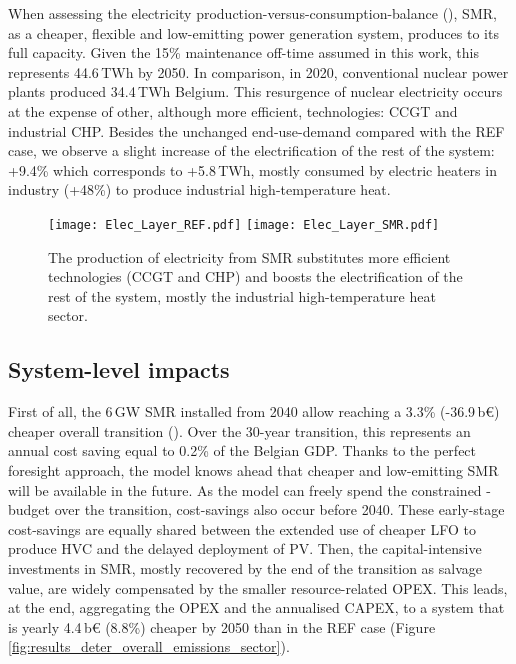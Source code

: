 \newpage
When assessing the electricity production-versus-consumption-balance (), \gls{SMR}, as a cheaper, flexible and low-emitting power generation system, produces to its full capacity. Given the 15\% maintenance off-time assumed in this work, this represents 44.6\,TWh by 2050. In comparison, in 2020, conventional nuclear power plants produced 34.4\,TWh Belgium. This resurgence of nuclear electricity occurs at the expense of other, although more efficient, technologies: \gls{CCGT} and industrial \gls{CHP}. Besides the unchanged end-use-demand compared with the REF case, we observe a slight increase of the electrification of the rest of the system: +9.4\% which corresponds to +5.8\,TWh, mostly consumed by electric heaters in industry (+48\%) to produce industrial high-temperature heat.

\begin{figure}[htbp!]
\centering
\texttt{[image: Elec\_Layer\_REF.pdf]}
\texttt{[image: Elec\_Layer\_SMR.pdf]}
\caption{The production of electricity from \gls{SMR} substitutes more efficient technologies (\ie \gls{CCGT} and \gls{CHP}) and boosts the electrification of the rest of the system, mostly the industrial high-temperature heat sector.}
\label{fig:results_deter_layer_elec}
\end{figure}

\newpage
\subsection{System-level impacts}
\label{subsec:atom_mol:results_deter_overall}
First of all, the 6\,GW \gls{SMR} installed from 2040 allow reaching a 3.3\% (-36.9\,b€) cheaper overall transition (). Over the 30-year transition, this represents an annual cost saving equal to 0.2\% of the Belgian GDP. Thanks to the perfect foresight approach, the model knows ahead that cheaper and low-emitting \gls{SMR} will be available in the future. As the model can freely spend the constrained -budget over the transition, cost-savings also occur before 2040. These early-stage cost-savings are equally shared between the extended use of cheaper \gls{LFO} to produce \gls{HVC} and the delayed deployment of \gls{PV}. Then, the capital-intensive investments in \gls{SMR}, mostly recovered by the end of the transition as salvage value, are widely compensated by the smaller resource-related OPEX. This leads, at the end, aggregating the OPEX and the annualised CAPEX, to a system that is yearly 4.4\,b€ (8.8\%) cheaper by 2050 than in the REF case (Figure \ref{fig:results_deter_overall_emissions_sector}).

